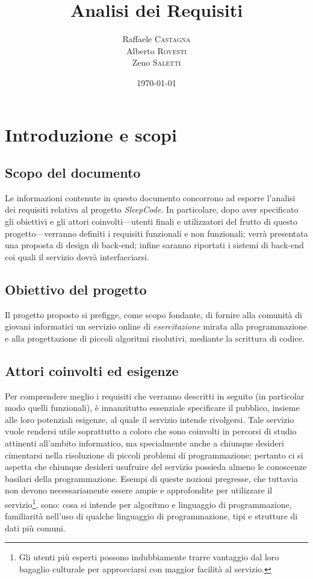 \documentclass[11pt, a4paper]{article}
\title{Analisi dei Requisiti}
\author{Raffaele \textsc{Castagna}\\
Alberto \textsc{Rovesti}\\
Zeno \textsc{Saletti}}
\date{\today}
\theoremstyle{definition}
\begin{document}


\tableofcontents


\newpage
\section{Introduzione e scopi}
\subsection{Scopo del documento}
Le informazioni contenute in questo documento concorrono ad esporre l'analisi
dei requisiti relativa al progetto \textit{SleepCode}. In particolare, dopo
aver specificato gli obiettivi e gli attori coinvolti—utenti finali e
utilizzatori del frutto di questo progetto—verranno definiti i requisiti
funzionali e non funzionali; verrà presentata una proposta di design di
back-end; infine saranno riportati i sistemi di back-end coi quali il servizio
dovrà interfacciarsi.


\subsection{Obiettivo del progetto}
Il progetto proposto si prefigge, come scopo fondante, di fornire alla comunità
di giovani informatici un servizio online di \textit{esercitazione} mirata alla
programmazione e alla progettazione di piccoli algoritmi risolutivi, mediante
la scrittura di codice.

\subsection{Attori coinvolti ed esigenze}
Per comprendere meglio i requisiti che verranno descritti in seguito (in
particolar modo quelli funzionali), è innanzitutto essenziale specificare
il pubblico, insieme alle loro potenziali esigenze, al quale il servizio
intende rivolgersi.
Tale servizio vuole rendersi utile soprattutto a coloro che sono coinvolti
in percorsi di studio attinenti all'ambito informatico, ma specialmente anche
a chiunque desideri cimentarsi nella risoluzione di piccoli problemi di
programmazione; pertanto ci si aspetta che chiunque desideri usufruire del
servizio possieda almeno le conoscenze basilari della programmazione. Esempi
di queste nozioni pregresse, che tuttavia non devono necessariamente essere ampie e approfondite per utilizzare il servizio\footnote{Gli utenti più esperti possono indubbiamente trarre vantaggio dal loro bagaglio culturale per
approcciarsi con maggior facilità al servizio.}, sono: cosa si intende per
algoritmo e linguaggio di programmazione, familiarità nell'uso di qualche
linguaggio di programmazione, tipi e strutture di dati più comuni.
\end{document}
